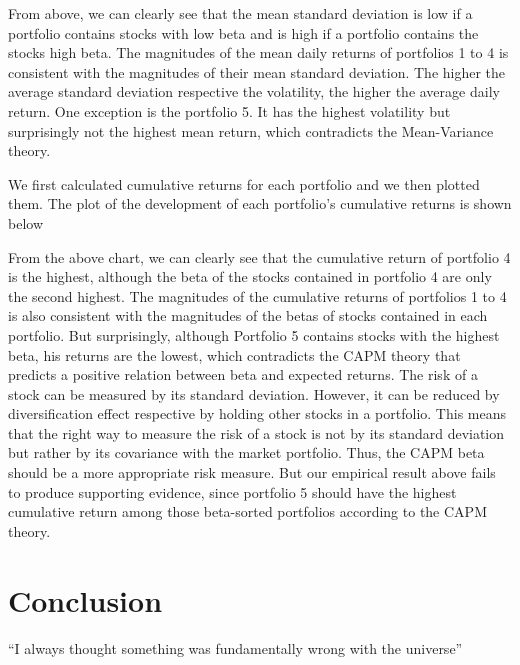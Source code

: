 \documentclass{article}
\begin{document}
From above, we can clearly see that the mean standard deviation is low if a portfolio contains stocks with low beta and is high if a portfolio contains the stocks high beta. The magnitudes of the mean daily returns of portfolios 1 to 4 is consistent with the magnitudes of their mean standard deviation. The higher the average standard deviation respective the volatility, the higher the average daily return. One exception is the portfolio 5. It has the highest volatility but surprisingly not the highest mean return, which contradicts the Mean-Variance theory.

We first calculated cumulative returns for each portfolio and we then plotted them. The plot of the development of each portfolio’s cumulative returns is shown below

From the above chart, we can clearly see that the cumulative return of portfolio 4 is the highest, although the beta of the stocks contained in portfolio 4 are only the second highest. The magnitudes of the cumulative returns of portfolios 1 to 4 is also consistent with the magnitudes of the betas of stocks contained in each portfolio. But surprisingly, although Portfolio 5 contains stocks with the highest beta, his returns are the lowest, which contradicts the CAPM theory that predicts a positive relation between beta and expected returns.
The risk of a stock can be measured by its standard deviation. However, it can be reduced by diversification effect respective by holding other stocks in a portfolio. This means that the right way to measure the risk of a stock is not by its standard deviation but rather by its covariance with the market portfolio. Thus, the CAPM beta should be a more appropriate risk measure.  But our empirical result above fails to produce supporting evidence, since portfolio 5 should have the highest cumulative return among those beta-sorted portfolios according to the CAPM theory.


\section{Conclusion}
``I always thought something was fundamentally wrong with the universe'' \citep{adams1995hitchhiker}



\end{document}
